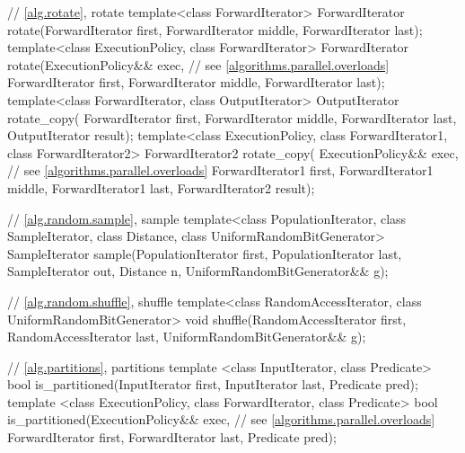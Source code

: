 \begin{codeblock}
{  // \ref{alg.rotate}, rotate
  template<class ForwardIterator>
    ForwardIterator rotate(ForwardIterator first,
                           ForwardIterator middle,
                           ForwardIterator last);
  template<class ExecutionPolicy, class ForwardIterator>
    ForwardIterator rotate(ExecutionPolicy&& exec, // see \ref{algorithms.parallel.overloads}
                           ForwardIterator first,
                           ForwardIterator middle,
                           ForwardIterator last);
  template<class ForwardIterator, class OutputIterator>
    OutputIterator rotate_copy(
      ForwardIterator first, ForwardIterator middle,
      ForwardIterator last, OutputIterator result);
  template<class ExecutionPolicy, class ForwardIterator1, class ForwardIterator2>
    ForwardIterator2 rotate_copy(
      ExecutionPolicy&& exec, // see \ref{algorithms.parallel.overloads}
      ForwardIterator1 first, ForwardIterator1 middle,
      ForwardIterator1 last, ForwardIterator2 result);

  // \ref{alg.random.sample}, sample
  template<class PopulationIterator, class SampleIterator,
           class Distance, class UniformRandomBitGenerator>
    SampleIterator sample(PopulationIterator first, PopulationIterator last,
                          SampleIterator out, Distance n,
                          UniformRandomBitGenerator&& g);

  // \ref{alg.random.shuffle}, shuffle
  template<class RandomAccessIterator, class UniformRandomBitGenerator>
    void shuffle(RandomAccessIterator first,
                 RandomAccessIterator last,
                 UniformRandomBitGenerator&& g);

  // \ref{alg.partitions}, partitions
  template <class InputIterator, class Predicate>
    bool is_partitioned(InputIterator first, InputIterator last, Predicate pred);
  template <class ExecutionPolicy, class ForwardIterator, class Predicate>
    bool is_partitioned(ExecutionPolicy&& exec, // see \ref{algorithms.parallel.overloads}
                        ForwardIterator first, ForwardIterator last, Predicate pred);

}
\end{codeblock}
